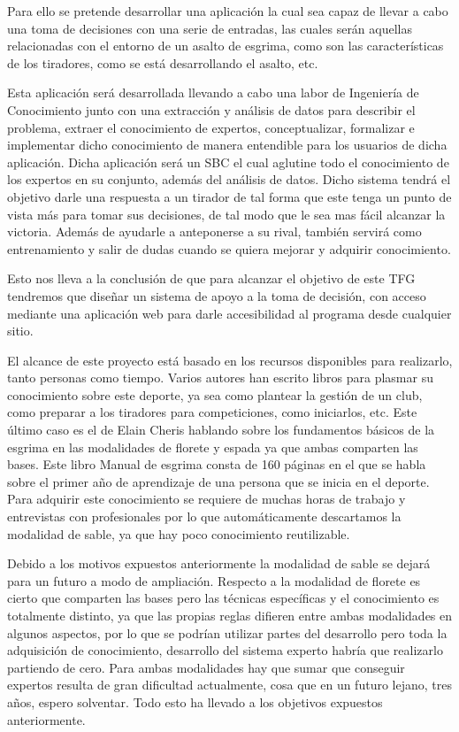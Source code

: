 Para ello se pretende desarrollar una aplicación la cual sea capaz de llevar a
 cabo una toma de decisiones con una serie de entradas, las cuales serán aquellas
 relacionadas con el entorno de un asalto de esgrima, como son las características
 de los tiradores, como se está desarrollando el asalto, etc.

Esta aplicación será desarrollada llevando a cabo una labor de Ingeniería de Conocimiento
 junto con una extracción y análisis de datos para describir el problema, extraer
 el conocimiento de expertos, conceptualizar, formalizar e implementar dicho conocimiento
 de manera entendible para los usuarios de dicha aplicación. Dicha aplicación será un \acf{SBC}
 el cual aglutine todo el conocimiento de los expertos en su conjunto, además del análisis
 de datos. Dicho sistema tendrá el objetivo darle una respuesta a un tirador de tal forma
 que este tenga un punto de vista más para tomar sus decisiones, de tal modo que le sea mas
 fácil alcanzar la victoria. Además de ayudarle a anteponerse a su rival, también servirá
 como entrenamiento y salir de dudas cuando se quiera mejorar y adquirir conocimiento.

Esto nos lleva a la conclusión de que para alcanzar el objetivo de este \acs{TFG} tendremos
 que diseñar un sistema de apoyo a la toma de decisión, con acceso mediante una aplicación
 web para darle accesibilidad al programa desde cualquier sitio.

El alcance de este proyecto está basado en los recursos disponibles para realizarlo, tanto personas como tiempo.
 Varios autores han escrito libros para plasmar su conocimiento sobre este deporte,
 ya sea como plantear la gestión de un club, como preparar a los tiradores para competiciones,
 como iniciarlos, etc. Este último caso es el de Elain Cheris hablando sobre los fundamentos
 básicos de la esgrima en las modalidades de florete y espada ya que ambas comparten
 las bases. Este libro Manual de esgrima\cite{manualdeesgrima} consta de 160 páginas en el que se habla sobre
 el primer año de aprendizaje de una persona que se inicia en el deporte. Para adquirir
 este conocimiento se requiere de muchas horas de trabajo y entrevistas con profesionales
 por lo que automáticamente descartamos la modalidad de sable, ya que hay poco conocimiento
 reutilizable.

Debido a los motivos expuestos anteriormente la modalidad de sable se dejará para un futuro
 a modo de ampliación. Respecto a la modalidad de florete es cierto que comparten
 las bases pero las técnicas específicas y el conocimiento es totalmente distinto,
 ya que las propias reglas difieren entre ambas modalidades en algunos aspectos,
 por lo que se podrían utilizar partes del desarrollo pero toda la adquisición de
 conocimiento, desarrollo del sistema experto habría que realizarlo partiendo de cero.
 Para ambas modalidades hay que sumar que conseguir expertos resulta de gran dificultad
 actualmente, cosa que en un futuro lejano, tres años, espero solventar. Todo esto ha
 llevado a los objetivos expuestos anteriormente.

